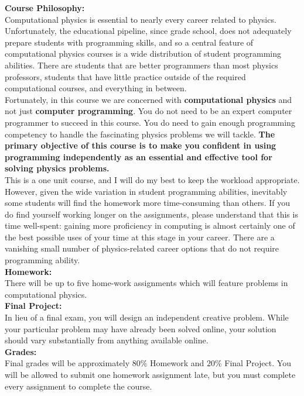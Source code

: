 \documentclass[12pt]{article}
\begin{document}
\noindent
\textbf {Course Philosophy:}\\
Computational physics is essential to nearly every career related to
physics.  Unfortunately, the educational pipeline, since grade school,
does not adequately prepare students with programming skills, and so a
central feature of computational physics courses is a wide
distribution of student programming abilities.  There are students
that are better programmers than most physics professors, students
that have little practice outside of the required computational
courses, and everything in between.\\[3pt]

\noindent
Fortunately, in this course we are concerned with {\bf computational
  physics} and not just {\bf computer programming}.  You do not need
to be an expert computer programmer to succeed in this course. You do
need to gain enough programming competency to handle the fascinating
physics problems we will tackle.  {\bf The primary objective of this
  course is to make you confident in using programming independently
  as an essential and effective tool for solving physics
  problems.}\\[3pt]

\noindent
This is a one unit course, and I will do my best to keep the workload
appropriate.  However, given the wide variation in student programming
abilities, inevitably some students will find the homework more
time-consuming than others.  If you do find yourself working longer on
the assignments, please understand that this is time well-spent:
gaining more proficiency in computing is almost certainly one of the
best possible uses of your time at this stage in your career.  There
are a vanishing small number of physics-related career options that do
not require programming ability.\\[3pt]

\noindent
\textbf{Homework:}\\
There will be up to five home-work assignments which will feature problems in computational physics.\\[3pt]

\noindent
\textbf{Final Project:}\\ In lieu of a final exam, you will design an
independent creative problem.  While your particular problem may have
already been solved online, your solution should vary substantially
from anything available online.\\[3pt]

\noindent
\textbf {Grades:}\\
Final grades will be approximately $80\%$ Homework and $20\%$ Final Project.  You will be allowed to submit one homework assignment late, but you must complete every assignment to complete the course.\\
\end{document}
